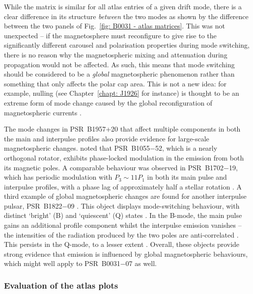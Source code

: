 While the matrix is similar for all atlas entries of a given drift mode, there is a clear difference in its structure \textit{between} the two modes as shown by the difference between the two panels of Fig.~\ref{fig: B0031 - atlas matrices}. This was not unexpected -- if the magnetosphere must reconfigure to give rise to the significantly different carousel and polarisation properties during mode switching, there is no reason why the magnetospheric mixing and attenuation during propagation would not be affected. As such, this means that mode switching should be considered to be a \textit{global} magnetospheric phenomenon rather than something that only affects the polar cap area. This is not a new idea: for example, nulling (see Chapter~\ref{chapt: J1926} for instance) is thought to be an extreme form of mode change \citep[e.g.][]{Bxxx1992,WMJx2007} caused by the global reconfiguration of magnetospheric currents \citep{KLO+2006,Txxx2010b}. 

The mode changes in PSR~B1957+20 that affect multiple components in both the main and interpulse profiles \citep{MKMP2018} also provide evidence for large-scale magnetospheric changes. \citet{WWJx2012} noted that PSR~B1055$-$52, which is a nearly orthogonal rotator, exhibits phase-locked modulation in the emission from both its magnetic poles. A comparable behaviour was observed in PSR~B1702$-$19, which has periodic modulation with $P_3 \sim 11P_1$ in both its main pulse and interpulse profiles, with a phase lag of approximately half a stellar rotation \citep{WWSx2007}. A third example of global magnetospheric changes are found for another interpulse pulsar, PSR~B1822$-$09 \citep{BMRx2010}. This object displays mode-switching behaviour, with distinct `bright' (B) and `quiescent' (Q) states \citep{FWMx1981}. In the B-mode, the main pulse gains an additional profile component whilst the interpulse emission vanishes -- the intensities of the radiation produced by the two poles are anti-correlated \citep{FWxx1982, GJKx1994}. This persists in the Q-mode, to a lesser extent \citep[Fig. 11]{BMRx2010}. Overall, these objects provide strong evidence that emission is influenced by global magnetospheric behaviours, which might well apply to PSR~B0031$-$07 as well.


\subsubsection{Evaluation of the atlas plots}
\label{sec: B0031 - discuss - atlas - atlas plots evaluation}

